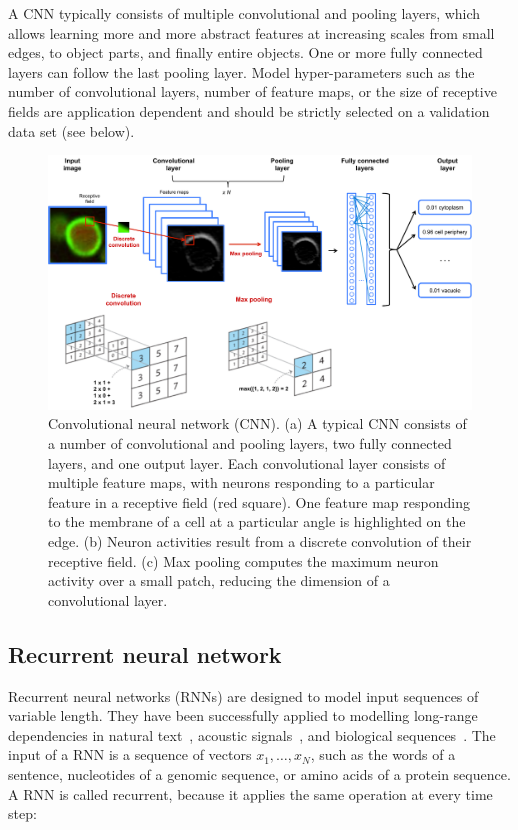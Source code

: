 A CNN typically consists of multiple convolutional and pooling layers, which allows learning more and more abstract features at increasing scales from small edges, to object parts, and finally entire objects. One or more fully connected layers can follow the last pooling layer. Model hyper-parameters such as the number of convolutional layers, number of feature maps, or the size of receptive fields are application dependent and should be strictly selected on a validation data set (see below).


\begin{figure}[htbp!]
\centering
\includegraphics[width=1.0\textwidth]{cnn}
\caption[Convolutional neural network (CNN).]{Convolutional neural network (CNN). (a) A typical CNN consists of a number of convolutional and pooling layers, two fully connected layers, and one output layer. Each convolutional layer consists of multiple feature maps, with neurons responding to a particular feature in a receptive field (red square). One feature map responding to the membrane of a cell at a particular angle is highlighted on the edge. (b) Neuron activities result from a discrete convolution of their receptive field. (c) Max pooling computes the maximum neuron activity over a small patch, reducing the dimension of a convolutional layer.}
\label{fig:cnn}
\end{figure}


\subsection{Recurrent neural network} \label{sec:dl_rnn}
Recurrent neural networks (RNNs) are designed to model input sequences of variable length. They have been successfully applied to modelling long-range dependencies in natural text~\citep{sutskever_sequence_2014,bahdanau_neural_2014,xiong_dynamic_2016}, acoustic signals~\citep{deng_deep_2015,graves_speech_2013,hinton_deep_2012}, and biological sequences~\citep{agathocleous_protein_2010,sonderby_protein_2014,li_protein_2016,quang_danq:_2016}.  The input of a RNN is a sequence of vectors $x_1,\ldots,x_N$, such as the words of a sentence, nucleotides of a genomic sequence, or amino acids of a protein sequence. A RNN is called recurrent, because it applies the same operation at every time step:

